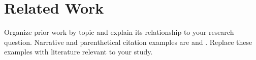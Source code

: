 \section{Related Work}
\label{sec:related}
Organize prior work by topic and explain its relationship to your research
question. Narrative and parenthetical citation examples are
\citet{vaswani2017attention} and \citep{goodfellow2016deep,Hinton06}.
Replace these examples with literature relevant to your study.
